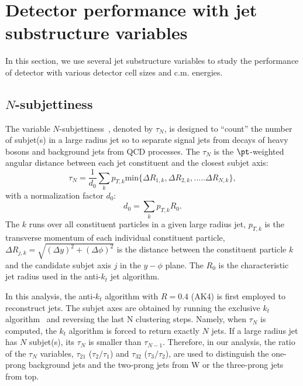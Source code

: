 \section{Detector performance with jet substructure variables}

In this section, we use several jet substructure variables to study the performance of detector with various detector cell sizes and c.m. energies.

\subsection{$N$-subjettiness \label{sec:nsub}}
The variable $N$-subjettiness~\cite{Thaler:2010tr}, denoted by $\tau_N$, is designed to 
``count'' the number of subjet(s) in a large radius jet so to separate 
signal jets from decays of heavy bosons and background jets from QCD processes. 
The $\tau_N$ is the $\pt$-weighted angular distance between each jet 
constituent and the closest subjet axis: 
\begin{equation}\label{eq:Nsub_1}
\tau_{N}=\frac{1}{d_{0}}\sum_{k}p_{T,k} \mathrm{min}\{\Delta R_{1,k},\Delta R_{2,k},.....\Delta R_{N,k}\},
\end{equation}
with a normalization factor $d_0$: \[d_{0}=\sum_{k}p_{T,k} R_{0}.\] 
The $k$ runs over all constituent particles in a given large radius jet, 
$p_{T,k}$ is the transverse momentum of each individual constituent particle, 
$\Delta R_{j,k}=\sqrt{(\Delta y)^{2}+(\Delta \phi)^{2}}$ is the distance 
between the constituent particle $k$ and the candidate subjet axis $j$ in the 
$y-\phi$ plane. The $R_{0}$ is the characteristic jet radius used in 
the anti-$k_t$ jet algorithm. 

In this analysis, the anti-$k_t$ algorithm with $R=0.4$ (AK4) is first 
employed to reconstruct jets. The subjet axes are obtained by running the 
exclusive $k_{t}$ algorithm~\cite{Catani:246812} and reversing the last N clustering steps. 
Namely, when $\tau_N$ is computed, the $k_{t}$ algorithm is forced to return 
exactly $N$ jets. If a large radius jet has $N$ subjet(s), its $\tau_{N}$ is 
smaller than $\tau_{N-1}$. Therefore, in our analysis, 
the ratio of the $\tau_{N}$ variables, 
$\tau_{21}$ ($\tau_{2}/\tau_{1}$) and $\tau_{32}$ ($\tau_{3}/\tau_{2}$),  
are used to distinguish the one-prong background jets and 
the two-prong jets from W or the three-prong jets from top. 

